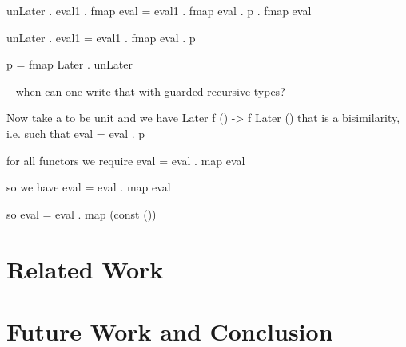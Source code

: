 \documentclass[hoptionsi,review,format=sigplan]{acmart}
\begin{document}
unLater . eval1 . fmap eval = eval1 . fmap eval . p . fmap eval

unLater . eval1 = eval1 . fmap eval . p

p = fmap Later . unLater

-- when can one write that with guarded recursive types?

Now take a to be unit and we have Later f () -> f Later () that is a bisimilarity, i.e. such that eval = eval . p

for all functors we require eval = eval . map eval

so we have eval = eval . map eval

so eval = eval . map (const ())

\section{Related Work}

\section{Future Work and Conclusion}
\end{document}

